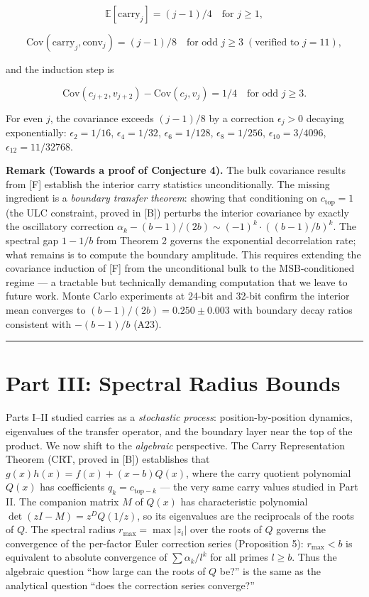 \documentclass[
  11pt,
]{article}
\begin{document}
\[\mathbb{E}[\mathrm{carry}_j] = (j-1)/4 \quad \text{for } j \geq 1,\]

\[\mathrm{Cov}(\mathrm{carry}_j, \mathrm{conv}_j) = (j-1)/8 \quad \text{for odd } j \geq 3 \; (\text{verified to } j = 11),\]

and the induction step is

\[\mathrm{Cov}(c_{j+2}, v_{j+2}) - \mathrm{Cov}(c_j, v_j) = 1/4 \quad \text{for odd } j \geq 3.\]

For even \(j\), the covariance exceeds \((j-1)/8\) by a correction
\(\epsilon_j > 0\) decaying exponentially: \(\epsilon_2 = 1/16\),
\(\epsilon_4 = 1/32\), \(\epsilon_6 = 1/128\), \(\epsilon_8 = 1/256\),
\(\epsilon_{10} = 3/4096\), \(\epsilon_{12} = 11/32768\).

\textbf{Remark (Towards a proof of Conjecture 4).} The bulk covariance results
from {[}F{]} establish the interior carry statistics unconditionally. The
missing ingredient is a \emph{boundary transfer theorem}: showing that
conditioning on \(c_{\text{top}} = 1\) (the ULC constraint, proved in {[}B{]})
perturbs the interior covariance by exactly the oscillatory correction
\(\alpha_k - (b-1)/(2b) \sim (-1)^k \cdot ((b-1)/b)^k\). The spectral gap
\(1 - 1/b\) from Theorem 2 governs the exponential decorrelation rate; what
remains is to compute the boundary amplitude. This requires extending the
covariance induction of {[}F{]} from the unconditional bulk to the
MSB-conditioned regime --- a tractable but technically demanding computation
that we leave to future work. Monte Carlo experiments at 24-bit and 32-bit
confirm the interior mean converges to \((b-1)/(2b) = 0.250 \pm 0.003\) with
boundary decay ratios consistent with \(-(b-1)/b\) (A23).

\begin{center}\rule{0.5\linewidth}{0.5pt}\end{center}

\section{Part III: Spectral Radius
Bounds}\label{part-iii-spectral-radius-bounds}

Parts I--II studied carries as a \emph{stochastic process}: position-by-position
dynamics, eigenvalues of the transfer operator, and the boundary layer near the
top of the product. We now shift to the \emph{algebraic} perspective. The Carry
Representation Theorem (CRT, proved in {[}B{]}) establishes that
\(g(x)h(x) = f(x) + (x-b)Q(x)\), where the carry quotient polynomial \(Q(x)\)
has coefficients \(q_k = c_{\text{top}-k}\) --- the very same carry values
studied in Part II. The companion matrix \(M\) of \(Q(x)\) has characteristic
polynomial \(\det(zI - M) = z^D Q(1/z)\), so its eigenvalues are the reciprocals
of the roots of \(Q\). The spectral radius \(r_{\max} = \max|z_i|\) over the
roots of \(Q\) governs the convergence of the per-factor Euler correction series
(Proposition 5): \(r_{\max} < b\) is equivalent to absolute convergence of
\(\sum \alpha_k / l^k\) for all primes \(l \geq b\). Thus the algebraic question
``how large can the roots of \(Q\) be?'' is the same as the analytical question
``does the correction series converge?''
\end{document}

